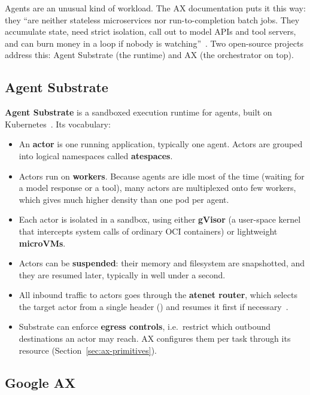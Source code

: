 Agents are an unusual kind of workload. The AX documentation puts it this way: they ``are neither stateless microservices nor run-to-completion batch jobs. They accumulate state, need strict isolation, call out to model APIs and tool servers, and can burn money in a loop if nobody is watching''~\cite{ax}. Two open-source projects address this: Agent Substrate (the runtime) and AX (the orchestrator on top).

\subsection{Agent Substrate}

\textbf{Agent Substrate} is a sandboxed execution runtime for agents, built on Kubernetes~\cite{substrate}. Its vocabulary:

\begin{itemize}
  \item An \textbf{actor} is one running application, typically one agent. Actors are grouped into logical namespaces called \textbf{atespaces}.
  \item Actors run on \textbf{workers}. Because agents are idle most of the time (waiting for a model response or a tool), many actors are multiplexed onto few workers, which gives much higher density than one pod per agent.
  \item Each actor is isolated in a sandbox, using either \textbf{gVisor} (a user-space kernel that intercepts system calls of ordinary OCI containers) or lightweight \textbf{microVMs}.
  \item Actors can be \textbf{suspended}: their memory and filesystem are snapshotted, and they are resumed later, typically in well under a second.
  \item All inbound traffic to actors goes through the \textbf{atenet router}, which selects the target actor from a single header () and resumes it first if necessary~\cite{ax-networking}.
  \item Substrate can enforce \textbf{egress controls}, i.e.\ restrict which outbound destinations an actor may reach. AX configures them per task through its  resource (Section~\ref{sec:ax-primitives}).
\end{itemize}

\subsection{Google AX}

